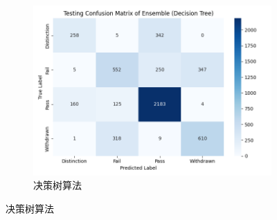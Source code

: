 \documentclass[a4paper, utf8]{ctexart}
\begin{document}
\begin{figure}
\begin{subfigure}{.32\textwidth}
			\includegraphics[width=\textwidth]{./figure/test_ensem_cart.png}
			\caption{决策树算法}
		\end{subfigure}
		

\end{figure}
\end{document}
